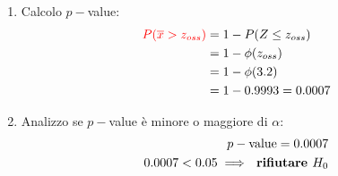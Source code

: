 \documentclass{article}  %
\theoremstyle{definition}
\begin{document}
\begin{esercizio}
\begin{enumerate}
		\item Calcolo $p-$value:
		      \begin{align*}
			      \textcolor{red}{P(\overline{x} > z_ {oss})} & = 1 - P(Z \leq z_ {oss}) \\
			                                                  & = 1 - \phi(z_{oss})      \\
			                                                  & = 1- \phi(3.2)           \\
			                                                  & = 1- 0.9993 = 0.0007
		      \end{align*}
		\item Analizzo se $p-$value è minore o maggiore di $\alpha$:
		      \begin{align*}
			      p-\text{value} = 0.0007 \\
			      0.0007 < 0.05 \implies \text{\textbf{ rifiutare $H_0$}}
		      \end{align*}
	\end{enumerate}
\end{esercizio}
\end{document}
